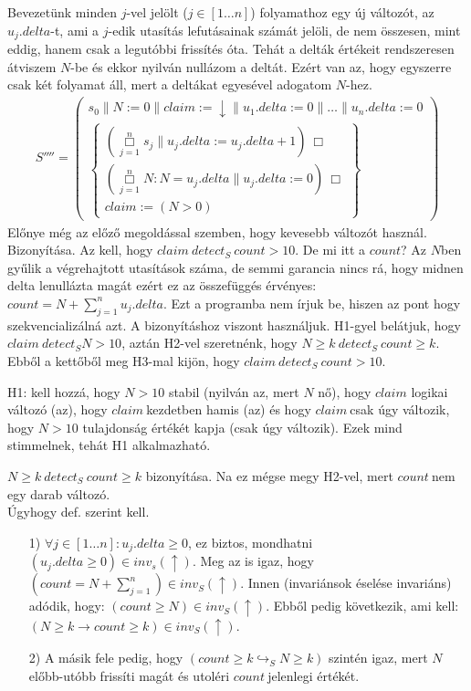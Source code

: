 \documentclass{article}
\newcommand{\Claim}{$claim\ $}
\newcommand{\Count}{$count\ $}
\newcommand{\loopBox}{\overset{n}{\underset{j=1}{\Box}}}
\newcommand{\false}{\downarrow}
\newcommand{\true}{\uparrow}
\newcommand{\pp}{\parallel}
\begin{document}
Bevezetünk minden $j$-vel jelölt ($j\in [1\dots n]$) folyamathoz egy új változót, az $u_j.delta$-t, ami a $j$-edik utasítás lefutásainak számát jelöli, de nem összesen, mint eddig, hanem csak a legutóbbi frissítés óta. Tehát a delták értékeit rendszeresen átviszem $N$-be és ekkor nyilván nullázom a deltát. Ezért van az, hogy egyszerre csak két folyamat áll, mert a deltákat egyesével adogatom $N$-hez.
\begin{align*}
S''''=\left( \begin{array}{l}
s_0\pp N:=0\pp claim:=\false \pp u_1.delta:=0\pp \dots \pp u_n.delta:=0 \\
\left\{ \begin{array}{l}
(\loopBox s_j \pp u_j.delta := u_j.delta+1)\ \Box\\
(\loopBox N:N=u_j.delta \pp u_j.delta:=0)\ \Box\\
claim:=(N>0)
\end{array}\right\}
\end{array}\right)
\end{align*}
Előnye még az előző megoldással szemben, hogy kevesebb változót használ.\\
Bizonyítása. Az kell, hogy $claim\ detect_S\ count > 10$. De mi itt a $count$? Az $N$ben gyűlik a végrehajtott utasítások száma, de semmi garancia nincs rá, hogy midnen delta lenullázta magát ezért ez az összefüggés érvényes: $count = N + \sum_{j=1}^{n} u_j.delta$. Ezt a programba nem írjuk be, hiszen az pont hogy szekvencializálná azt. A bizonyításhoz viszont használjuk. H1-gyel belátjuk, hogy $claim\ detect_S N>10$, aztán H2-vel szeretnénk, hogy $N \geq k\ detect_S\ count \geq k$. Ebből a kettőből meg H3-mal kijön, hogy $claim\ detect_S\ count>10$.

H1: kell hozzá, hogy $N>10$ stabil (nyilván az, mert $N$ nő), hogy $claim$ logikai változó (az), hogy \Claim kezdetben hamis (az) és hogy \Claim csak úgy változik, hogy $N > 10$ tulajdonság értékét kapja (csak úgy változik). Ezek mind stimmelnek, tehát H1 alkalmazható.

$N \geq k\ detect_S\ count \geq k$ bizonyítása. Na ez mégse megy H2-vel, mert \Count nem egy darab változó.
\\
Úgyhogy def. szerint kell.
\begin{enumerate}
\item[1)] $\forall j \in [1\dots n]: u_j.delta \geq 0$, ez biztos, mondhatni $(u_j.delta \geq 0) \in inv_s(\true)$. Meg az is igaz, hogy $(count = N+ \sum_{j=1}^{n}) \in inv_S(\true)$. Innen (invariánsok éselése invariáns) adódik, hogy: $(count \geq N) \in inv_S(\true)$. Ebből pedig következik, ami kell: $(N \geq k \rightarrow count \geq k) \in inv_S(\true)$.
\item[2)] A másik fele pedig, hogy $(count \geq k \hookrightarrow_S N \geq k)$ szintén igaz, mert $N$ előbb-utóbb frissíti magát és utoléri \Count jelenlegi értékét.
\end{enumerate}
\end{document}
